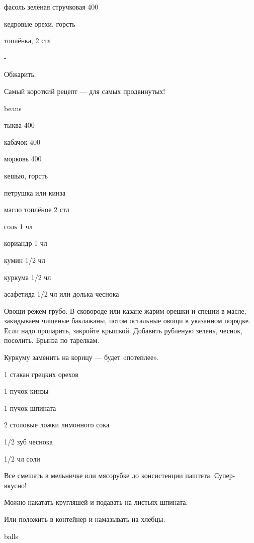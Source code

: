{
\item фасоль зелёная стручковая 400
\item кедровые орехи, горсть
\item топлёнка, 2 стл
}{
\item -
}{
Обжарить.
}{
\begin{advice}
\item Самый короткий рецепт — для самых продвинутых!
\end{advice}}{beans}



{
\item тыква 400
\item кабачок 400
\item морковь 400
\item кешью, горсть
\item петрушка или кинза
\item масло топлёное 2 стл
}{
\item соль 1 чл
\item кориандр 1 чл
\item кумин 1/2 чл
\item куркума 1/2 чл
\item асафетида 1/2 чл или долька чеснока
}{
Овощи режем грубо. В сковороде или казане жарим орешки и специи в масле, закидываем чищеные баклажаны, потом остальные овощи в указанном порядке. Если надо пропарить, закройте крышкой. Добавить рубленую зелень, чеснок, посолить. Брынза по тарелкам.
}{
\begin{advice}
\item Куркуму заменить на корицу — будет «потеплее».
\end{advice}}{}



{
\item 1 стакан грецких орехов
\item 1 пучок кинзы
\item 1 пучок шпината
\item 2 столовые ложки лимонного сока
}{
\item 1/2 зуб чеснока
\item 1/2 чл соли
}{
Все смешать в мельничке или мясорубке до консистенции паштета. Супер-вкусно!
}{
\begin{advice}
\item Можно накатать кругляшей и подавать на листьях шпината.
\item Или положить в контейнер и намазывать на хлебцы.
\end{advice}}{balls}



